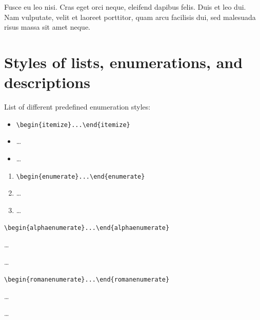 \documentclass[a4paper,UKenglish,cleveref, autoref]{lipics-v2019}
\begin{document}
Fusce eu leo nisi. Cras eget orci neque, eleifend dapibus felis. Duis et leo dui. Nam vulputate, velit et laoreet porttitor, quam arcu facilisis dui, sed malesuada risus massa sit amet neque.
%





\appendix

\section{Styles of lists, enumerations, and descriptions}

List of different predefined enumeration styles:

\begin{itemize}
\item \verb|\begin{itemize}...\end{itemize}|
\item \dots
\item \dots
\end{itemize}

\begin{enumerate}
\item \verb|\begin{enumerate}...\end{enumerate}|
\item \dots
\item \dots
\end{enumerate}

\begin{alphaenumerate}
\item \verb|\begin{alphaenumerate}...\end{alphaenumerate}|
\item \dots
\item \dots
\end{alphaenumerate}

\begin{romanenumerate}
\item \verb|\begin{romanenumerate}...\end{romanenumerate}|
\item \dots
\item \dots
\end{romanenumerate}
\end{document}
